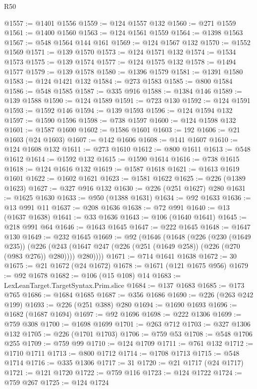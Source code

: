 \begin{lexlean}{R50}
\begin{coremodule}
@1557 := @1401 @1556
@1559 := @124 @1557 @132
@1560 := @271 @1559
@1561 := @1400 @1560
@1563 := @124 @1561 @1559
@1564 := @1398 @1563
@1567 := @548 @1564 @144 @161
@1569 := @124 @1567 @132
@1570 := @1552 @1569
@1571 := @139 @1570
@1573 := @124 @1571 @132
@1574 := @1534 @1573
@1575 := @139 @1574
@1577 := @124 @1575 @132
@1578 := @1494 @1577
@1579 := @139 @1578
@1580 := @1396 @1579
@1581 := @1391 @1580
@1583 := @124 @1421 @132
@1584 := @273 @1583
@1585 := @800 @1584
@1586 := @548 @1585
@1587 := @335 @916
@1588 := @1384 @146
@1589 := @139 @1588
@1590 := @124 @1589
@1591 := @723 @130
@1592 := @124 @1591
@1593 := @1592 @146
@1594 := @139 @1593
@1596 := @124 @1594 @132
@1597 := @1590 @1596
@1598 := @738 @1597
@1600 := @124 @1598 @132
@1601 := @1587 @1600
@1602 := @1586 @1601
@1603 := 192
@1606 := @21 @1603 (@24 @1603)
@1607 := @142 @1606
@1608 := @141 @1607
@1610 := @124 @1608 @132
@1611 := @273 @1610
@1612 := @800 @1611
@1613 := @548 @1612
@1614 := @1592 @132
@1615 := @1590 @1614
@1616 := @738 @1615
@1618 := @124 @1616 @132
@1619 := @1587 @1618
@1621 := @1613 @1619 @1601
@1622 := @1602 @1621
@1623 := @1581 @1622
@1625 := @226 (@1389 @1623)
@1627 := @327 @916 @132
@1630 := @226 (@251 @1627) @280
@1631 := @1625 @1630
@1633 := @950 (@1388 @1631)
@1634 := @92 @1633
@1636 := @13 @991 @11
@1637 := @208 @1636
@1638 := @72 @991
@1640 := @13 (@1637 @1638)
@1641 := @33 @1636
@1643 := @106 (@1640 @1641)
@1645 := @218 @991 @64
@1646 := @1643 @1645
@1647 := @222 @1645
@1648 := @1647 @130
@1649 := @232 @1645
@1669 := @92
    (@1646
      (@1648
        (@226
          (@230 (@1649 @235))
          (@226
            (@243 (@1647 @247 (@226 (@251 (@1649 @258)) (@226 (@270 (@983 @276)) @280))))
            @280))))
@1671 := @714 @1641 @1638
@1672 := 30
@1675 := @21 @1672 (@24 @1672)
@1678 := @1671 (@121 @1675 @956)
@1679 := @92 @1678
@1682 := @106 (@15 @108) @14
@1683 := LexLeanTarget.TargetSyntax.Prim.slice
@1684 := @137 @1683
@1685 := @173 @765
@1686 := @1684 @1685
@1687 := @356 @1686
@1690 := @226 (@263 @242 @199)
@1693 := @226 (@251 @388) @280
@1694 := @1690 @1693
@1696 := @1682 (@1687 @1694)
@1697 := @92 @1696
@1698 := @222 @1306
@1699 := @759 @308
@1700 := @1698 @1699
@1701 := @263 @712
@1703 := @327 @1306 @132
@1705 := @226 (@1701 @1703)
@1706 := @759 @53
@1708 := @548 @1706 @255
@1709 := @759 @99
@1710 := @124 @1709
@1711 := @761 @132
@1712 := @1710 @1711
@1713 := @800 @1712
@1714 := @1708 @1713
@1715 := @548 @1714
@1716 := @335 @1306
@1717 := 31
@1720 := @21 @1717 (@24 @1717)
@1721 := @121 @1720
@1722 := @759 @116
@1723 := @124 @1722
@1724 := @759 @267
@1725 := @124 @1724

\end{coremodule}
\end{lexlean}

